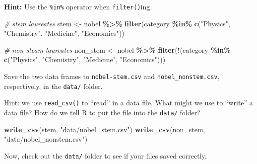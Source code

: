 \documentclass[
]{article}
\newenvironment{Shaded}{\begin{snugshade}}{\end{snugshade}}
\newcommand{\CommentTok}[1]{\textcolor[rgb]{0.56,0.35,0.01}{\textit{#1}}}
\newcommand{\FunctionTok}[1]{\textcolor[rgb]{0.13,0.29,0.53}{\textbf{#1}}}
\newcommand{\NormalTok}[1]{#1}
\newcommand{\OtherTok}[1]{\textcolor[rgb]{0.56,0.35,0.01}{#1}}
\newcommand{\SpecialCharTok}[1]{\textcolor[rgb]{0.81,0.36,0.00}{\textbf{#1}}}
\newcommand{\StringTok}[1]{\textcolor[rgb]{0.31,0.60,0.02}{#1}}
\begin{document}
\textbf{Hint:} Use the \texttt{\%in\%} operator when
\texttt{filter()}ing.

\begin{Shaded}
\begin{Highlighting}[]
\CommentTok{\# stem laureates}
\NormalTok{stem }\OtherTok{\textless{}{-}}\NormalTok{ nobel }\SpecialCharTok{\%\textgreater{}\%}
  \FunctionTok{filter}\NormalTok{(category }\SpecialCharTok{\%in\%} \FunctionTok{c}\NormalTok{(}\StringTok{"Physics"}\NormalTok{, }\StringTok{"Chemistry"}\NormalTok{, }\StringTok{"Medicine"}\NormalTok{, }\StringTok{"Economics"}\NormalTok{))}

\CommentTok{\# non{-}steam laureates}
\NormalTok{non\_stem }\OtherTok{\textless{}{-}}\NormalTok{ nobel }\SpecialCharTok{\%\textgreater{}\%}
  \FunctionTok{filter}\NormalTok{(}\SpecialCharTok{!}\NormalTok{(category }\SpecialCharTok{\%in\%} \FunctionTok{c}\NormalTok{(}\StringTok{"Physics"}\NormalTok{, }\StringTok{"Chemistry"}\NormalTok{, }\StringTok{"Medicine"}\NormalTok{, }\StringTok{"Economics"}\NormalTok{)))}
\end{Highlighting}
\end{Shaded}

Save the two data frames to \texttt{nobel-stem.csv} and
\texttt{nobel\_nonstem.csv}, respectively, in the \texttt{data/} folder.

Hint: we use \texttt{read\_csv()} to ``read'' in a data file. What might
we use to ``write'' a data file? How do we tell R to put the file into
the \texttt{data/} folder?

\begin{Shaded}
\begin{Highlighting}[]
\FunctionTok{write\_csv}\NormalTok{(stem, }\StringTok{"data/nobel\_stem.csv"}\NormalTok{)}
\FunctionTok{write\_csv}\NormalTok{(non\_stem, }\StringTok{"data/nobel\_nonstem.csv"}\NormalTok{)}
\end{Highlighting}
\end{Shaded}

Now, check out the \texttt{data/} folder to see if your files saved
correctly.
\end{document}
